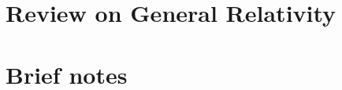 \documentclass[a4paper,pdftex,10pt]{report}
\begin{document}
\maketitle

\tableofcontents

\clearpage
\chapter{Review on General Relativity}






















\clearpage
\appendix
\chapter{Brief notes}

















\clearpage



\nocite{Wald:1984}
\nocite{Hawking:1973uf}
\nocite{Rovelli:2020}

\end{document}
